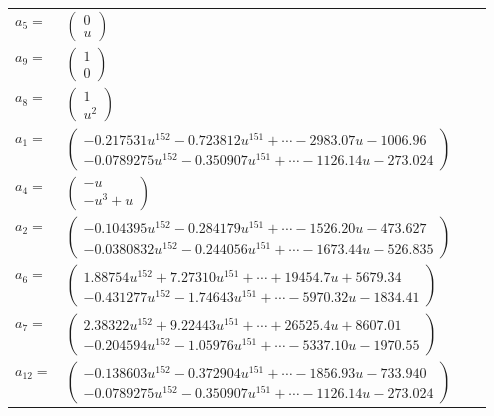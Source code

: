 \documentclass[1p]{elsarticle_modified}
\theoremstyle{definition}
\begin{document}
\begin{tabular}{m{7pt} m{180pt} m{7pt} m{180pt} }
\flushright $a_{5}=$&$\begin{pmatrix}0\\u\end{pmatrix}$ \\
\flushright $a_{9}=$&$\begin{pmatrix}1\\0\end{pmatrix}$ \\
\flushright $a_{8}=$&$\begin{pmatrix}1\\u^2\end{pmatrix}$ \\
\flushright $a_{1}=$&$\begin{pmatrix}-0.217531 u^{152}-0.723812 u^{151}+\cdots-2983.07 u-1006.96\\-0.0789275 u^{152}-0.350907 u^{151}+\cdots-1126.14 u-273.024\end{pmatrix}$ \\
\flushright $a_{4}=$&$\begin{pmatrix}- u\\- u^3+u\end{pmatrix}$ \\
\flushright $a_{2}=$&$\begin{pmatrix}-0.104395 u^{152}-0.284179 u^{151}+\cdots-1526.20 u-473.627\\-0.0380832 u^{152}-0.244056 u^{151}+\cdots-1673.44 u-526.835\end{pmatrix}$ \\
\flushright $a_{6}=$&$\begin{pmatrix}1.88754 u^{152}+7.27310 u^{151}+\cdots+19454.7 u+5679.34\\-0.431277 u^{152}-1.74643 u^{151}+\cdots-5970.32 u-1834.41\end{pmatrix}$ \\
\flushright $a_{7}=$&$\begin{pmatrix}2.38322 u^{152}+9.22443 u^{151}+\cdots+26525.4 u+8607.01\\-0.204594 u^{152}-1.05976 u^{151}+\cdots-5337.10 u-1970.55\end{pmatrix}$ \\
\flushright $a_{12}=$&$\begin{pmatrix}-0.138603 u^{152}-0.372904 u^{151}+\cdots-1856.93 u-733.940\\-0.0789275 u^{152}-0.350907 u^{151}+\cdots-1126.14 u-273.024\end{pmatrix}$ \\

\end{tabular}
\end{document}
